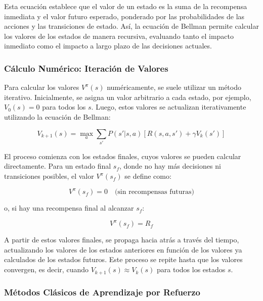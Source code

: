 \documentclass[a4paper,12pt, twoside]{report}
\begin{document}
Esta ecuación establece que el valor de un estado es la suma de la recompensa inmediata 
y el valor futuro esperado, ponderado por las probabilidades de las acciones y las 
transiciones de estado. Así, la ecuación de Bellman permite calcular los valores de 
los estados de manera recursiva, evaluando tanto el impacto inmediato como el impacto a 
largo plazo de las decisiones actuales.

\subsubsection{Cálculo Numérico: Iteración de Valores}

Para calcular los valores \(V^\pi(s)\) numéricamente, se suele utilizar un método iterativo. 
Inicialmente, se asigna un valor arbitrario a cada estado, por ejemplo, \(V_0(s) = 0\) para 
todos los \(s\). Luego, estos valores se actualizan iterativamente utilizando la ecuación de 
Bellman:

\begin{equation}
V_{k+1}(s) = \max_{a} \sum_{s'} P(s'|s,a) \left[ R(s,a,s') + \gamma V_k(s') \right]
\end{equation}

El proceso comienza con los estados finales, cuyos valores se pueden calcular directamente. 
Para un estado final \(s_f\), donde no hay más decisiones ni transiciones posibles, el 
valor \(V^\pi(s_f)\) se define como:

\begin{equation}
V^\pi(s_f) = 0 \quad \text{(sin recompensas futuras)} 
\end{equation}

o, si hay una recompensa final al alcanzar \(s_f\):

\begin{equation}
V^\pi(s_f) = R_f
\end{equation}

A partir de estos valores finales, se propaga hacia atrás a través del tiempo, actualizando 
los valores de los estados anteriores en función de los valores ya calculados de los estados 
futuros. Este proceso se repite hasta que los valores convergen, es decir, cuando \(V_{k+1}(s) 
\approx V_k(s)\) para todos los estados \(s\).


\subsubsection{Métodos Clásicos de Aprendizaje por Refuerzo}
\end{document}
